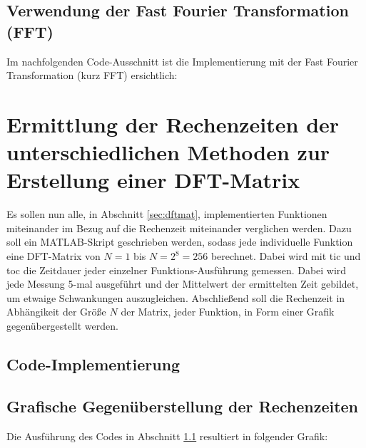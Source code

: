 \documentclass[12pt,a4paper]{article}
\begin{document}
	\pagebreak

	\subsection{Verwendung der Fast Fourier Transformation (FFT)}
	Im nachfolgenden Code-Ausschnitt ist die Implementierung mit der Fast Fourier Transformation (kurz FFT) ersichtlich: \\
	
		
	\pagebreak
	
	\section{Ermittlung der Rechenzeiten der unterschiedlichen Methoden zur Erstellung einer DFT-Matrix}
	Es sollen nun alle, in Abschnitt \ref{sec:dftmat}, implementierten Funktionen miteinander im Bezug auf die Rechenzeit miteinander verglichen werden. 
	Dazu soll ein MATLAB-Skript geschrieben werden, sodass jede individuelle Funktion eine DFT-Matrix von $N=1$ bis $N=2^{8}=256$ berechnet. Dabei wird mit tic und toc die Zeitdauer jeder einzelner Funktions-Ausführung gemessen.
	Dabei wird jede Messung 5-mal ausgef\"uhrt und der Mittelwert der ermittelten Zeit gebildet, um etwaige Schwankungen auszugleichen.
	Abschlie{\ss}end soll die Rechenzeit in Abh\"angikeit der Größe $N$ der Matrix, jeder Funktion, in Form einer Grafik gegen\"ubergestellt werden.
	
	\subsection{Code-Implementierung}
	\label{sec:rechzeitimpl}
	
	
	\subsection{Grafische Gegenüberstellung der Rechenzeiten}
	Die Ausführung des Codes in Abschnitt \ref{sec:rechzeitimpl} resultiert in folgender Grafik:
	
\end{document}
